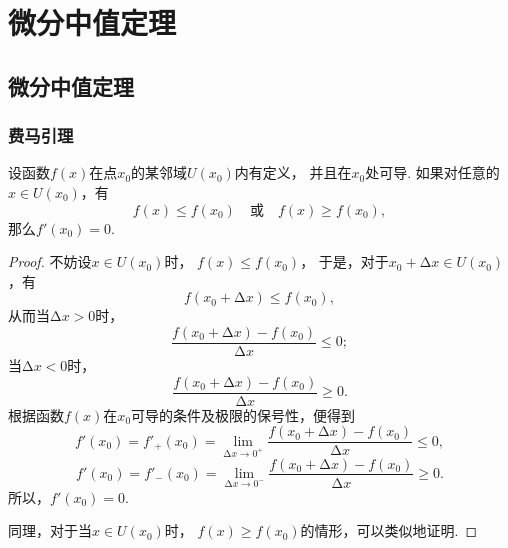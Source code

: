 \chapter{微分中值定理}
\section{微分中值定理}
\subsection{费马引理}
\begin{lemma}[费马引理]\label{theorem:微分中值定理.费马引理}
设函数\(f(x)\)在点\(x_0\)的某邻域\(U(x_0)\)内有定义，
并且在\(x_0\)处可导.
如果对任意的\(x \in U(x_0)\)，有
\[
    f(x) \leq f(x_0)
    \quad\text{或}\quad
    f(x) \geq f(x_0),
\]
那么\(f'(x_0) = 0\).
\begin{proof}
不妨设\(x \in U(x_0)\)时，
\(f(x) \leq f(x_0)\)，
于是，对于\(x_0 + \increment x \in U(x_0)\)，有\[
    f(x_0 + \increment x) \leq f(x_0),
\]
从而当\(\increment x > 0\)时，\[
    \frac{f(x_0 + \increment x) - f(x_0)}{\increment x} \leq 0;
\]
当\(\increment x < 0\)时，\[
    \frac{f(x_0 + \increment x) - f(x_0)}{\increment x} \geq 0.
\]
根据函数\(f(x)\)在\(x_0\)可导的条件及极限的保号性，便得到\[
    f'(x_0) = f'_+(x_0)
    = \lim\limits_{\increment x\to0^+}
    \frac{f(x_0 + \increment x) - f(x_0)}{\increment x} \leq 0,
\]\[
    f'(x_0) = f'_-(x_0)
    = \lim\limits_{\increment x\to0^-}
    \frac{f(x_0 + \increment x) - f(x_0)}{\increment x} \geq 0.
\]
所以，\(f'(x_0) = 0\).

同理，对于当\(x \in U(x_0)\)时，
\(f(x) \geq f(x_0)\)的情形，可以类似地证明.
\end{proof}
\end{lemma}

